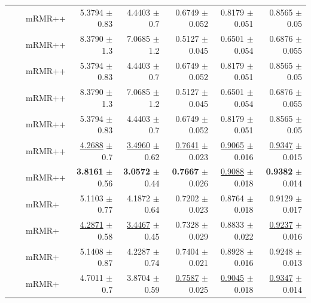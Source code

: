 \begin{longtable}{llp{}rrrrr}
 &  & mRMR++ & 5.3794 {\scriptsize $\pm$ 0.83} & 4.4403 {\scriptsize $\pm$ 0.7} & 0.6749 {\scriptsize $\pm$ 0.052} & 0.8179 {\scriptsize $\pm$ 0.051} & 0.8565 {\scriptsize $\pm$ 0.05} \\
 &  & mRMR++ & 8.3790 {\scriptsize $\pm$ 1.3} & 7.0685 {\scriptsize $\pm$ 1.2} & 0.5127 {\scriptsize $\pm$ 0.045} & 0.6501 {\scriptsize $\pm$ 0.054} & 0.6876 {\scriptsize $\pm$ 0.055} \\
 &  & mRMR++ & 5.3794 {\scriptsize $\pm$ 0.83} & 4.4403 {\scriptsize $\pm$ 0.7} & 0.6749 {\scriptsize $\pm$ 0.052} & 0.8179 {\scriptsize $\pm$ 0.051} & 0.8565 {\scriptsize $\pm$ 0.05} \\
 &  & mRMR++ & 8.3790 {\scriptsize $\pm$ 1.3} & 7.0685 {\scriptsize $\pm$ 1.2} & 0.5127 {\scriptsize $\pm$ 0.045} & 0.6501 {\scriptsize $\pm$ 0.054} & 0.6876 {\scriptsize $\pm$ 0.055} \\
 &  & mRMR++ & 5.3794 {\scriptsize $\pm$ 0.83} & 4.4403 {\scriptsize $\pm$ 0.7} & 0.6749 {\scriptsize $\pm$ 0.052} & 0.8179 {\scriptsize $\pm$ 0.051} & 0.8565 {\scriptsize $\pm$ 0.05} \\
 &  & mRMR++ & \underline{4.2688} {\scriptsize $\pm$ 0.7} & \underline{3.4960} {\scriptsize $\pm$ 0.62} & \underline{0.7641} {\scriptsize $\pm$ 0.023} & \underline{0.9065} {\scriptsize $\pm$ 0.016} & \underline{0.9347} {\scriptsize $\pm$ 0.015} \\
 &  & mRMR++ & \textbf{3.8161} {\scriptsize $\pm$ 0.56} & \textbf{3.0572} {\scriptsize $\pm$ 0.44} & \textbf{0.7667} {\scriptsize $\pm$ 0.026} & \underline{0.9088} {\scriptsize $\pm$ 0.018} & \textbf{0.9382} {\scriptsize $\pm$ 0.014} \\
 &  & mRMR+ & 5.1103 {\scriptsize $\pm$ 0.77} & 4.1872 {\scriptsize $\pm$ 0.64} & 0.7202 {\scriptsize $\pm$ 0.023} & 0.8764 {\scriptsize $\pm$ 0.018} & 0.9129 {\scriptsize $\pm$ 0.017} \\
 &  & mRMR+ & \underline{4.2871} {\scriptsize $\pm$ 0.58} & \underline{3.4467} {\scriptsize $\pm$ 0.45} & 0.7328 {\scriptsize $\pm$ 0.029} & 0.8833 {\scriptsize $\pm$ 0.022} & \underline{0.9237} {\scriptsize $\pm$ 0.016} \\
 &  & mRMR+ & 5.1408 {\scriptsize $\pm$ 0.87} & 4.2287 {\scriptsize $\pm$ 0.74} & 0.7404 {\scriptsize $\pm$ 0.021} & 0.8928 {\scriptsize $\pm$ 0.016} & 0.9248 {\scriptsize $\pm$ 0.013} \\
 &  & mRMR+ & 4.7011 {\scriptsize $\pm$ 0.7} & 3.8704 {\scriptsize $\pm$ 0.59} & \underline{0.7587} {\scriptsize $\pm$ 0.025} & \underline{0.9045} {\scriptsize $\pm$ 0.018} & \underline{0.9347} {\scriptsize $\pm$ 0.014} \\

\end{longtable}

